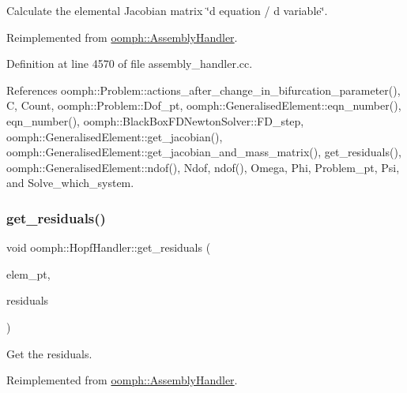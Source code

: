Calculate the elemental Jacobian matrix \char`\"{}d equation 
/ d variable\char`\"{}. 



Reimplemented from \hyperlink{classoomph_1_1AssemblyHandler_ad43c3d8760be0ba6ebee8d82509458e5}{oomph\+::\+Assembly\+Handler}.



Definition at line 4570 of file assembly\+\_\+handler.\+cc.



References oomph\+::\+Problem\+::actions\+\_\+after\+\_\+change\+\_\+in\+\_\+bifurcation\+\_\+parameter(), C, Count, oomph\+::\+Problem\+::\+Dof\+\_\+pt, oomph\+::\+Generalised\+Element\+::eqn\+\_\+number(), eqn\+\_\+number(), oomph\+::\+Black\+Box\+F\+D\+Newton\+Solver\+::\+F\+D\+\_\+step, oomph\+::\+Generalised\+Element\+::get\+\_\+jacobian(), oomph\+::\+Generalised\+Element\+::get\+\_\+jacobian\+\_\+and\+\_\+mass\+\_\+matrix(), get\+\_\+residuals(), oomph\+::\+Generalised\+Element\+::ndof(), Ndof, ndof(), Omega, Phi, Problem\+\_\+pt, Psi, and Solve\+\_\+which\+\_\+system.

\mbox{\label{classoomph_1_1HopfHandler_a61a4006161da6532a9acfec0f979aafa}} 
\subsubsection{\texorpdfstring{get\+\_\+residuals()}{get\_residuals()}}
{\footnotesize\ttfamily void oomph\+::\+Hopf\+Handler\+::get\+\_\+residuals (\begin{DoxyParamCaption}\item[{\hyperlink{classoomph_1_1GeneralisedElement}{Generalised\+Element} $\ast$const \&}]{elem\+\_\+pt,  }\item[{\hyperlink{classoomph_1_1Vector}{Vector}$<$ double $>$ \&}]{residuals }\end{DoxyParamCaption})\hspace{0.3cm}{\ttfamily [virtual]}}



Get the residuals. 



Reimplemented from \hyperlink{classoomph_1_1AssemblyHandler_a7a6203b0ab90da62b4da2af8a26d08b3}{oomph\+::\+Assembly\+Handler}.



